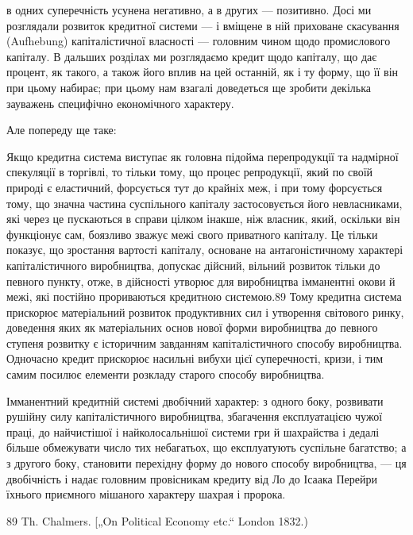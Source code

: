 в одних суперечність усунена негативно, а в других — позитивно.
Досі ми розглядали розвиток кредитної системи — і вміщене
в ній приховане скасування (Aufhebung) капіталістичної власності — головним чином щодо промислового
капіталу. В дальших розділах ми розглядаємо кредит щодо капіталу, що дає процент, як
такого, а також його вплив на цей останній, як і ту форму, що
її він при цьому набирає; при цьому нам взагалі доведеться ще
зробити декілька зауважень специфічно економічного характеру.

Але попереду ще таке:

Якщо кредитна система виступає як головна підойма перепродукції та надмірної спекуляції в торгівлі,
то тільки тому,
що процес репродукції, який по своїй природі є еластичний,
форсується тут до крайніх меж, і при тому форсується тому,
що значна частина суспільного капіталу застосовується його
невласниками, які через це пускаються в справи цілком інакше,
ніж власник, який, оскільки він функціонує сам, боязливо зважує
межі свого приватного капіталу. Це тільки показує, що зростання вартості капіталу, основане на
антагоністичному характері
капіталістичного виробництва, допускає дійсний, вільний розвиток тільки до певного пункту, отже, в
дійсності утворює для виробництва імманентні окови й межі, які постійно прориваються
кредитною системою.89 Тому кредитна система прискорює матеріальний розвиток продуктивних сил і
утворення світового ринку,
доведення яких як матеріальних основ нової форми виробництва
до певного ступеня розвитку є історичним завданням капіталістичного способу виробництва. Одночасно
кредит прискорює насильні вибухи цієї суперечності, кризи, і тим самим посилює елементи розкладу
старого способу виробництва.

Імманентний кредитній системі двобічний характер: з одного
боку, розвивати рушійну силу капіталістичного виробництва,
збагачення експлуатацією чужої праці, до найчистішої і найколосальнішої системи гри й шахрайства і
дедалі більше обмежувати число тих небагатьох, що експлуатують суспільне багатство; а з другого
боку, становити перехідну форму до нового
способу виробництва, — ця двобічність і надає головним провісникам кредиту від Ло до Ісаака Перейри
їхнього приємного мішаного характеру шахрая і пророка.

89 Th. Chalmers. [„On Political Economy etc.“ London 1832.)
